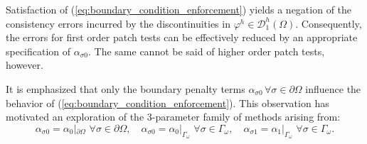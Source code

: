 Satisfaction of (\ref{eq:boundary_condition_enforcement}) yields a negation of the consistency errors incurred by the discontinuities in $\varphi^h \in \mathcal{D}^h_1 (\Omega)$. Consequently, the errors for first order patch tests can be effectively reduced by an appropriate specification of $\alpha_{\sigma0}$. The same cannot be said of higher order patch tests, however.

It is emphasized that only the boundary penalty terms $\alpha_{\sigma0} \, \forall \sigma \in \partial \Omega$ influence the behavior of (\ref{eq:boundary_condition_enforcement}). This observation has motivated an exploration of the 3-parameter family of methods arising from:
	\begin{equation}
		\alpha_{\sigma 0} = \alpha_{0}|_{\partial \Omega} \, \, \forall \sigma \in \partial \Omega, \quad \alpha_{\sigma 0} = \alpha_{0}|_{\Gamma_{\omega}} \, \, \forall \sigma \in \Gamma_{\omega}, \quad \alpha_{\sigma 1} = \alpha_{1}|_{\Gamma_{\omega}} \, \, \forall \sigma \in \Gamma_{\omega}.
		\label{eq:penalty_parameters}
	\end{equation}
	
